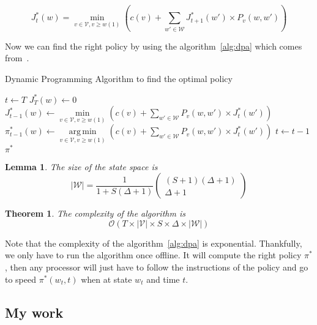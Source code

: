 \documentclass[
10pt, %
a4paper, %
oneside, %
headinclude,footinclude, %
BCOR5mm, %
]{scrartcl}
\DeclareMathOperator*{\argmin}{arg\,min}
\newcommand{\V}{\mathcal{V}}
\newcommand{\W}{\mathcal{W}}
\newtheorem{theo}{Theorem}
\newtheorem{lemma}{Lemma}
\begin{document}
\begin{equation}
  \label{eq:bellman}
  J^*_t(w)=\min_{v\in\V,v\geq w(1)}\left(
    c(v)+\sum_{w'\in\W}J^*_{t+1}(w')\times P_v(w,w') \right)
\end{equation}

Now we can find the right policy by using the
algorithm~\ref{alg:dpa} which comes from~\cite{Gaujal}.\\

\begin{algorithm}
  \caption{Dynamic Programming Algorithm to find the optimal policy}
  \label{alg:dpa}
  \begin{algorithmic}
    \STATE $t\leftarrow T$
    \FORALL{$w\in\W$}
    \STATE $J_T^*(w)\leftarrow 0$
    \ENDFOR
    \FORALL{$w\in\W$}
    \STATE $J_{t-1}^*(w)\leftarrow
    \min\limits_{v\in\V,v\geq
      w(1)}\left(c(v)+\sum\limits_{w'\in\W}P_v(w,w')\times
      J_t^*(w')\right)$
    \STATE $\pi_{t-1}^*(w)\leftarrow
    \argmin\limits_{v\in\V,v\geq
      w(1)}\left(c(v)+\sum\limits_{w'\in\W}P_v(w,w')\times
      J_t^*(w')\right)$
    \ENDFOR
    \STATE $t\leftarrow t-1$
    \ENDWHILE
    \RETURN $\pi^*$
  \end{algorithmic}
  
\end{algorithm}

\begin{lemma}
  The size of the state space is
  \[
    |\W|=\frac{1}{1+S(\Delta+1)}
    \left(
      \begin{matrix}
        (S+1)(\Delta+1) \\
        \Delta+1
      \end{matrix}
    \right)
  \]
\end{lemma}


\begin{theo}
  The complexity of the algorithm is
  \[
    \mathcal{O}(T\times|\V|\times S\times\Delta\times|\W|)
  \]
\end{theo}


Note that the complexity of the algorithm~\ref{alg:dpa} is
exponential. Thankfully, we only have to run the algorithm once offline. It
will compute the right policy $\pi^*$, then any processor will
just have to follow the instructions of the policy and go to speed
$\pi^*(w_t,t)$ when at state $w_t$ and time $t$.

\subsection{My work}
\end{document}
